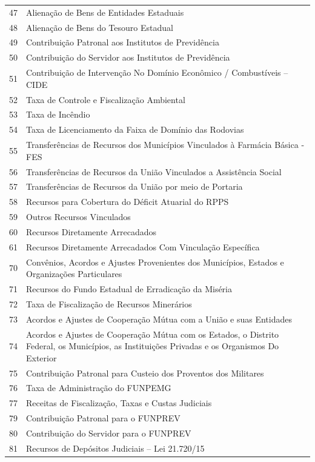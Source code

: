 \documentclass{article} %
\begin{document}
\begin{longtable}[c]{m{1cm}|m{11cm}}
47 & Alienação de Bens de Entidades Estaduais \\
48 & Alienação de Bens do Tesouro Estadual \\
49 & Contribuição Patronal aos Institutos de Previdência \\
50 & Contribuição do Servidor aos Institutos de Previdência \\
51 & Contribuição de Intervenção No Domínio Econômico / Combustíveis – CIDE \\
52 & Taxa de Controle e Fiscalização Ambiental \\
53 & Taxa de Incêndio \\
54 & Taxa de Licenciamento da Faixa de Domínio das Rodovias \\
55 & Transferências de Recursos dos Municípios Vinculados à Farmácia Básica - FES \\
56 & Transferências de Recursos da União Vinculados a Assistência Social \\
57 & Transferências de Recursos da União por meio de Portaria \\
58 & Recursos para Cobertura do Déficit Atuarial do RPPS \\
59 & Outros Recursos Vinculados \\
60 & Recursos Diretamente Arrecadados \\
61 & Recursos Diretamente Arrecadados Com Vinculação Específica \\
70 & Convênios, Acordos e Ajustes Provenientes dos Municípios, Estados e Organizações Particulares \\
71 & Recursos do Fundo Estadual de Erradicação da Miséria \\
72 & Taxa de Fiscalização de Recursos Minerários \\
73 & Acordos e Ajustes de Cooperação Mútua com a União e suas Entidades \\
74 & Acordos e Ajustes de Cooperação Mútua com os Estados, o Distrito Federal, os Municípios, as Instituições Privadas e os Organismos Do Exterior \\
75 & Contribuição Patronal para Custeio dos Proventos dos Militares \\
76 & Taxa de Administração do FUNPEMG \\
77 & Receitas de Fiscalização, Taxas e Custas Judiciais \\
79 & Contribuição Patronal para o FUNPREV \\
80 & Contribuição do Servidor para o FUNPREV  \\
81 & Recursos de Depósitos Judiciais – Lei 21.720/15 \\

\end{longtable}
\end{document}
